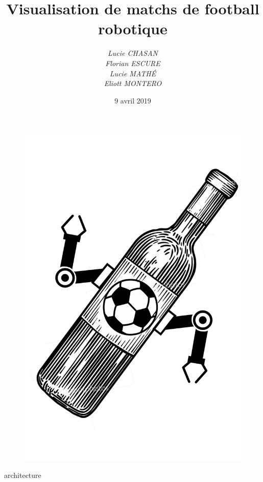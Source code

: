\documentclass[a4paper,12pt]{report}
\title{Visualisation de matchs de football robotique}
\author{ 
\textit{Lucie CHASAN}\\
\textit{Florian ESCURE}\\
\textit{Lucie MATHÉ}\\
\textit{Eliott MONTERO}\\
}
\date{9 avril 2019}
\begin{document}
\begin{figure}[!b]  
\begin{center}  
\includegraphics[scale=1]{images/vin.png}  
\end{center}  
\end{figure} 
\maketitle
\tableofcontents





 {architecture}





\printbibliography

\newpage
\end{document}
